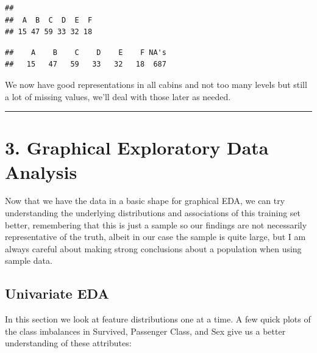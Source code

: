 \documentclass[]{article}
\newenvironment{Shaded}{\begin{snugshade}}{\end{snugshade}}
\newcommand{\KeywordTok}[1]{\textcolor[rgb]{0.13,0.29,0.53}{\textbf{#1}}}
\newcommand{\StringTok}[1]{\textcolor[rgb]{0.31,0.60,0.02}{#1}}
\newcommand{\CommentTok}[1]{\textcolor[rgb]{0.56,0.35,0.01}{\textit{#1}}}
\newcommand{\OtherTok}[1]{\textcolor[rgb]{0.56,0.35,0.01}{#1}}
\newcommand{\OperatorTok}[1]{\textcolor[rgb]{0.81,0.36,0.00}{\textbf{#1}}}
\newcommand{\NormalTok}[1]{#1}
\begin{document}
\begin{verbatim}
## 
##  A  B  C  D  E  F 
## 15 47 59 33 32 18
\end{verbatim}

\begin{Shaded}
\end{Shaded}

\begin{verbatim}
##    A    B    C    D    E    F NA's 
##   15   47   59   33   32   18  687
\end{verbatim}

We now have good representations in all cabins and not too many levels
but still a lot of missing values, we'll deal with those later as
needed.

\begin{center}\rule{0.5\linewidth}{\linethickness}\end{center}

\section{3. Graphical Exploratory Data
Analysis}\label{graphical-exploratory-data-analysis}

Now that we have the data in a basic shape for graphical EDA, we can try
understanding the underlying distributions and associations of this
training set better, remembering that this is just a sample so our
findings are not necessarily representative of the truth, albeit in our
case the sample is quite large, but I am always careful about making
strong conclusions about a population when using sample data.

\subsection{Univariate EDA}\label{univariate-eda}

In this section we look at feature distributions one at a time. A few
quick plots of the class imbalances in Survived, Passenger Class, and
Sex give us a better understanding of these attributes:
\end{document}
